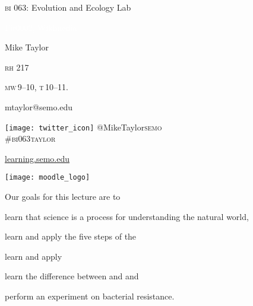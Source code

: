 \documentclass[t]{beamer}
\begin{document}
{
\begin{frame}[b,plain]{\textcolor{orange7}{\textsc{bi} 063: Evolution and Ecology Lab}}


\hfill\textcolor{white}{\tiny Fir0002, Wikimedia }
\end{frame}
}

{
\begin{frame}[t,plain]
	\large
	\vspace{5ex}
	\hangpara \hspace{17em} Mike Taylor

	\hangpara \hspace{17em} \textsc{rh} 217

	\hangpara \hspace{17em} \textsc{mw}\,9--10, \textsc{t}\,10--11.

	\hangpara \hspace{17em} mtaylor@semo.edu
	
	\hangpara \hspace{17em} \texttt{[image: twitter\_icon]} @MikeTaylor\textsc{semo}\\
	\hspace{17em} \#\textsc{bi}063\textsc{taylor}

\end{frame}
}


\begin{frame}[t]{\href{http://learning.semo.edu}{learning.semo.edu}}
	\begin{center}
		\texttt{[image: moodle\_logo]}
		
		\medskip
		
	\end{center}
	
\end{frame}




\begin{frame}[t]{Our goals for this lecture are to}

	\hangpara learn that science is a process for understanding the natural world,
	
	\hangpara learn and apply the five steps of the 
		
	\hangpara learn and apply 
	
	\hangpara learn the difference between  and  and
	
	\hangpara perform an experiment on bacterial resistance.
	
\end{frame}
\end{document}
